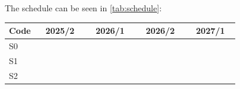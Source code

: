\documentclass[journal,onecolumn]{IEEEtran}
\begin{document}
The schedule can be seen in \autoref{tab:schedule}:

\begin{table}[ht]
\centering
\begin{tabular}{|l|llllll|llllll|llllll|llllll|}
\hline
Code & \multicolumn{6}{c|}{2025/2}                                                                                                                                     & \multicolumn{6}{c|}{2026/1}                                                                                                                                     & \multicolumn{6}{c|}{2026/2}                                                                                                                                     & \multicolumn{6}{c|}{2027/1}                                                                                                             \\ \hline
S0   & \cellcolor[HTML]{414868} & \cellcolor[HTML]{414868} & \cellcolor[HTML]{414868} & \cellcolor[HTML]{414868} & \cellcolor[HTML]{414868} & \cellcolor[HTML]{414868} & \cellcolor[HTML]{414868} & \cellcolor[HTML]{414868} & \cellcolor[HTML]{414868} &                          &                          &                          &                          &                          &                          &                          &                          &                          &                          &                          &                          &                          &                          &  \\ \hline
S1   & \cellcolor[HTML]{414868} & \cellcolor[HTML]{414868} & \cellcolor[HTML]{414868} & \cellcolor[HTML]{414868} & \cellcolor[HTML]{414868} & \cellcolor[HTML]{414868} & \cellcolor[HTML]{414868} & \cellcolor[HTML]{414868} & \cellcolor[HTML]{414868} &                          &                          &                          &                          &                          &                          &                          &                          &                          &                          &                          &                          &                          &                          &  \\ \hline
S2   & \cellcolor[HTML]{414868} & \cellcolor[HTML]{414868} & \cellcolor[HTML]{414868} & \cellcolor[HTML]{414868} & \cellcolor[HTML]{414868} & \cellcolor[HTML]{414868} & \cellcolor[HTML]{414868} & \cellcolor[HTML]{414868} & \cellcolor[HTML]{414868} &                          &                          &                          &                          &                          &                          &                          &                          &                          &                          &                          &                          &                          &                          &  \\ \hline

\end{tabular}
\end{table}
\end{document}
